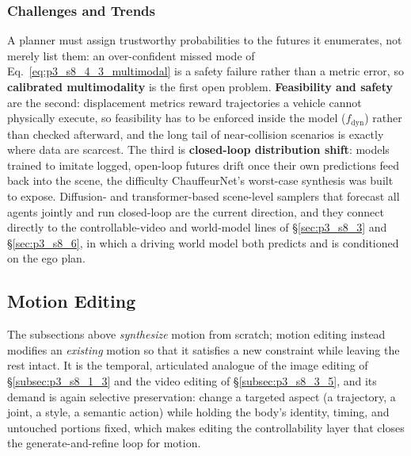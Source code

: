 \subsubsection{Challenges and Trends}
\label{subsubsec:p3_s8_4_3_challenges}
A planner must assign trustworthy probabilities to the futures it enumerates, not merely list them: an over-confident missed mode of Eq.~\eqref{eq:p3_s8_4_3_multimodal} is a safety failure rather than a metric error, so \textbf{calibrated multimodality} is the first open problem.
\textbf{Feasibility and safety} are the second: displacement metrics reward trajectories a vehicle cannot physically execute, so feasibility has to be enforced inside the model ($f_{\text{dyn}}$) rather than checked afterward, and the long tail of near-collision scenarios is exactly where data are scarcest.
The third is \textbf{closed-loop distribution shift}: models trained to imitate logged, open-loop futures drift once their own predictions feed back into the scene, the difficulty ChauffeurNet's worst-case synthesis was built to expose.
Diffusion- and transformer-based scene-level samplers that forecast all agents jointly and run closed-loop are the current direction, and they connect directly to the controllable-video and world-model lines of §\ref{sec:p3_s8_3} and §\ref{sec:p3_s8_6}, in which a driving world model both predicts and is conditioned on the ego plan.







\subsection{Motion Editing}
\label{subsec:p3_s8_4_4}
The subsections above \emph{synthesize} motion from scratch; motion editing instead modifies an \emph{existing} motion so that it satisfies a new constraint while leaving the rest intact. It is the temporal, articulated analogue of the image editing of §\ref{subsec:p3_s8_1_3} and the video editing of §\ref{subsec:p3_s8_3_5}, and its demand is again selective preservation: change a targeted aspect (a trajectory, a joint, a style, a semantic action) while holding the body's identity, timing, and untouched portions fixed, which makes editing the controllability layer that closes the generate-and-refine loop for motion.



